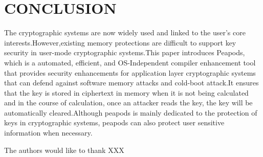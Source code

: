 
\section{CONCLUSION}
The cryptographic systems are now widely used and linked to the user's core interests.However,existing memory protections are difficult to support key security in user-mode cryptographic systems.This paper introduces Peapods, which is a automated, efficient, and OS-Independent compiler enhancement tool that provides security enhancements for application layer cryptographic systems that can defend against software memory attacks and cold-boot attack.It ensures that the key is stored in ciphertext in memory when it is not being calculated and in the course of calculation, once an attacker reads the key, the key will be automatically cleared.Although peapods is mainly dedicated to the protection of keys in cryptographic systems, peapods can also protect user sensitive information when necessary.

\begin{acks}

The authors would like to thank XXX


\end{acks}



